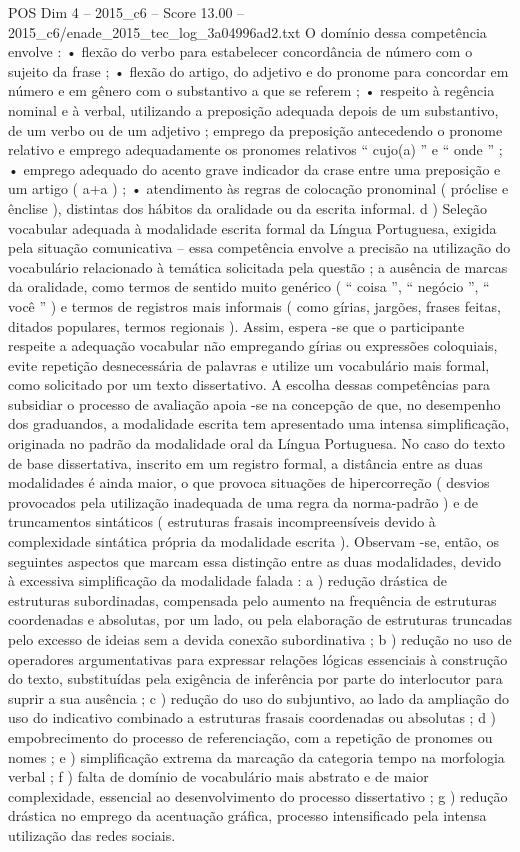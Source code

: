 \begin{textsample}{POS Dim 4 – 2015\_c6 – Score 13.00 – 2015\_c6/enade\_2015\_tec\_log\_3a04996ad2.txt}
O domínio dessa competência envolve : • flexão do verbo para estabelecer concordância de número com o sujeito da frase ; • flexão do artigo, do adjetivo e do pronome para concordar em número e em gênero com o substantivo a que se referem ; • respeito à regência nominal e à verbal, utilizando a preposição adequada depois de um substantivo, de um verbo ou de um adjetivo ; emprego da preposição antecedendo o pronome relativo e emprego adequadamente os pronomes relativos “ cujo(a) ” e “ onde ” ; • emprego adequado do acento grave indicador da crase entre uma preposição e um artigo ( a+a ) ; • atendimento às regras de colocação pronominal ( próclise e ênclise ), distintas dos hábitos da oralidade ou da escrita informal. d ) Seleção vocabular adequada à modalidade escrita formal da Língua Portuguesa, exigida pela situação comunicativa – essa competência envolve a precisão na utilização do vocabulário relacionado à temática solicitada pela questão ; a ausência de marcas da oralidade, como termos de sentido muito genérico ( “ coisa ”, “ negócio ”, “ você ” ) e termos de registros mais informais ( como gírias, jargões, frases feitas, ditados populares, termos regionais ).
Assim, espera -se que o participante respeite a adequação vocabular não empregando gírias ou expressões coloquiais, evite repetição desnecessária de palavras e utilize um vocabulário mais formal, como solicitado por um texto dissertativo.
A escolha dessas competências para subsidiar o processo de avaliação apoia -se na concepção de que, no desempenho dos graduandos, a modalidade escrita tem apresentado uma intensa simplificação, originada no padrão da modalidade oral da Língua Portuguesa.
No caso do texto de base dissertativa, inscrito em um registro formal, a distância entre as duas modalidades é ainda maior, o que provoca situações de hipercorreção ( desvios provocados pela utilização inadequada de uma regra da norma-padrão ) e de truncamentos sintáticos ( estruturas frasais incompreensíveis devido à complexidade sintática própria da modalidade escrita ).
Observam -se, então, os seguintes aspectos que marcam essa distinção entre as duas modalidades, devido à excessiva simplificação da modalidade falada : a ) redução drástica de estruturas subordinadas, compensada pelo aumento na frequência de estruturas coordenadas e absolutas, por um lado, ou pela elaboração de estruturas truncadas pelo excesso de ideias sem a devida conexão subordinativa ; b ) redução no uso de operadores argumentativas para expressar relações lógicas essenciais à construção do texto, substituídas pela exigência de inferência por parte do interlocutor para suprir a sua ausência ; c ) redução do uso do subjuntivo, ao lado da ampliação do uso do indicativo combinado a estruturas frasais coordenadas ou absolutas ; d ) empobrecimento do processo de referenciação, com a repetição de pronomes ou nomes ; e ) simplificação extrema da marcação da categoria tempo na morfologia verbal ; f ) falta de domínio de vocabulário mais abstrato e de maior complexidade, essencial ao desenvolvimento do processo dissertativo ; g ) redução drástica no emprego da acentuação gráfica, processo intensificado pela intensa utilização das redes sociais.

\end{textsample}
